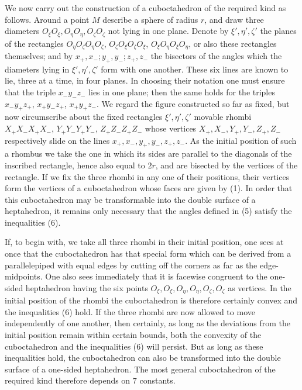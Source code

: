 \documentclass[11pt,a4paper]{article}
\begin{document}
We now carry out the construction of a cuboctahedron of the required kind as follows. Around a point $M$ describe a sphere of radius $r$, and draw three diameters $O_\xi O_\xi,O_\eta O_\eta,O_\zeta O_\zeta$ not lying in one plane. Denote by $\xi',\eta',\zeta'$ the planes of the rectangles $O_\eta O_\zeta O_\eta O_\zeta$, $O_\zeta O_\xi O_\zeta O_\xi$, $O_\xi O_\eta O_\xi O_\eta$, or also these rectangles themselves; and by $x_+,x_-;y_+,y_-;z_+,z_-$ the bisectors of the angles which the diameters lying in $\xi',\eta',\zeta'$ form with one another. These six lines are known to lie, three at a time, in four planes. In choosing their notation one must ensure that the triple $x_-y_-z_-$ lies in one plane; then the same holds for the triples $x_-y_+z_+$, $x_+y_-z_+$, $x_+y_+z_-$. We regard the figure constructed so far as fixed, but now circumscribe about the fixed rectangles $\xi',\eta',\zeta'$ movable rhombi $X_+X_-X_+X_-$, $Y_+Y_-Y_+Y_-$, $Z_+Z_-Z_+Z_-$ whose vertices $X_+,X_-,Y_+,Y_-,Z_+,Z_-$ respectively slide on the lines $x_+,x_-,y_+,y_-,z_+,z_-$. As the initial position of such a rhombus we take the one in which its sides are parallel to the diagonals of the inscribed rectangle, hence also equal to $2r$, and are bisected by the vertices of the rectangle. If we fix the three rhombi in any one of their positions, their vertices form the vertices of a cuboctahedron whose faces are given by (1). In order that this cuboctahedron may be transformable into the double surface of a heptahedron, it remains only necessary that the angles defined in (5) satisfy the inequalities (6).

If, to begin with, we take all three rhombi in their initial position, one sees at once that the cuboctahedron has that special form which can be derived from a parallelepiped with equal edges by cutting off the corners as far as the edge-midpoints. One also sees immediately that it is facewise congruent to the one-sided heptahedron having the six points $O_\xi,O_\xi,O_\eta,O_\eta,O_\zeta,O_\zeta$ as vertices. In the initial position of the rhombi the cuboctahedron is therefore certainly convex and the inequalities (6) hold. If the three rhombi are now allowed to move independently of one another, then certainly, as long as the deviations from the initial position remain within certain bounds, both the convexity of the cuboctahedron and the inequalities (6) will persist. But as long as these inequalities hold, the cuboctahedron can also be transformed into the double surface of a one-sided heptahedron. The most general cuboctahedron of the required kind therefore depends on $7$ constants.
\end{document}
